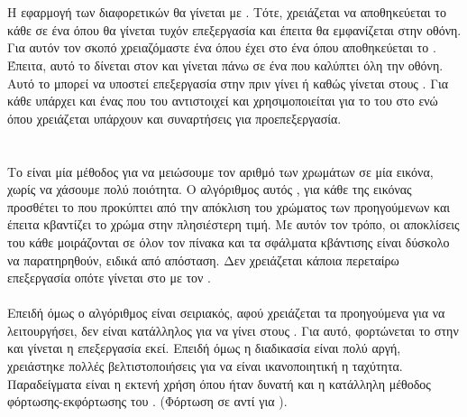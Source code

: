 \documentclass[11pt]{scrartcl} %
\begin{document}
\section{}
Η εφαρμογή των διαφορετικών  θα γίνεται με . Τότε, χρειάζεται να αποθηκεύεται το κάθε 
σε ένα  όπου θα γίνεται τυχόν επεξεργασία και έπειτα θα εμφανίζεται στην οθόνη. Για αυτόν τον σκοπό χρειαζόμαστε ένα 
όπου έχει στο  ένα  όπου αποθηκεύεται το . Έπειτα, αυτό το  δίνεται
στον  και γίνεται  πάνω σε ένα  που καλύπτει όλη την οθόνη. Αυτό το  μπορεί
να υποστεί επεξεργασία στην  πριν γίνει  ή καθώς γίνεται  στους . Για κάθε 
υπάρχει και ένας  που του αντιστοιχεί και χρησιμοποιείται για το  του  στο  ενώ όπου
χρειάζεται υπάρχουν και συναρτήσεις  για προεπεξεργασία.

\clearpage
\section{}
\subsection{}
Το  είναι μία μέθοδος για να μειώσουμε τον αριθμό των χρωμάτων σε μία εικόνα, χωρίς να χάσουμε πολύ
ποιότητα. Ο αλγόριθμος αυτός \cite{Floyd-Steinberg}, για κάθε  της εικόνας προσθέτει το  που προκύπτει από την απόκλιση του χρώματος
των προηγούμενων  και έπειτα κβαντίζει το χρώμα στην πλησιέστερη τιμή. Με αυτόν τον τρόπο, οι αποκλίσεις του κάθε 
μοιράζονται σε όλον τον πίνακα και τα σφάλματα κβάντισης είναι δύσκολο να παρατηρηθούν, ειδικά από απόσταση. Δεν χρειάζεται κάποια
περεταίρω επεξεργασία οπότε γίνεται  στο  με τον .
\\\\
Επειδή όμως ο αλγόριθμος είναι σειριακός, αφού χρειάζεται τα προηγούμενα  για να λειτουργήσει, δεν είναι κατάλληλος για
να γίνει στους . Για αυτό, φορτώνεται το  στην  και γίνεται η επεξεργασία εκεί. Επειδή όμως η
διαδικασία είναι πολύ αργή, χρειάστηκε πολλές βελτιστοποιήσεις για να είναι ικανοποιητική η ταχύτητα. Παραδείγματα είναι η
εκτενή χρήση  όπου ήταν δυνατή και η κατάλληλη μέθοδος φόρτωσης-εκφόρτωσης του .
(Φόρτωση σε  αντί για  \cite{TextureOptimizations}).
\end{document}
